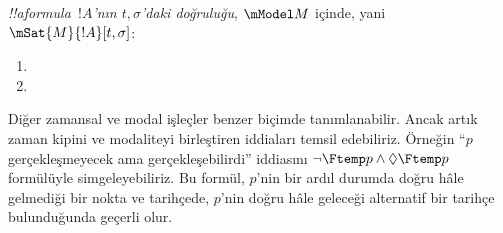 \documentclass[../../../include/open-logic-section]{subfiles}
\begin{document}
\begin{defn}
  \emph{!!a{formula}~$!A$'nın $t,\sigma$'daki doğruluğu}, $\mModel M$ içinde,
  yani $\mSat{M}{!A}[t,\sigma]$:
  \begin{enumerate}
  \item{} 
  \item{} 
  \end{enumerate} 
\end{defn}

Diğer zamansal ve modal işleçler benzer biçimde tanımlanabilir. Ancak artık
zaman kipini ve modaliteyi birleştiren iddiaları temsil edebiliriz. Örneğin
``$p$ gerçekleşmeyecek ama gerçekleşebilirdi'' iddiasını
$\lnot\Ftemp p\land\Diamond\Ftemp p$ formülüyle simgeleyebiliriz. Bu formül,
$p$'nin bir ardıl durumda doğru hâle gelmediği bir nokta ve tarihçede,
$p$'nin doğru hâle geleceği alternatif bir tarihçe bulunduğunda geçerli olur.
\end{document}

